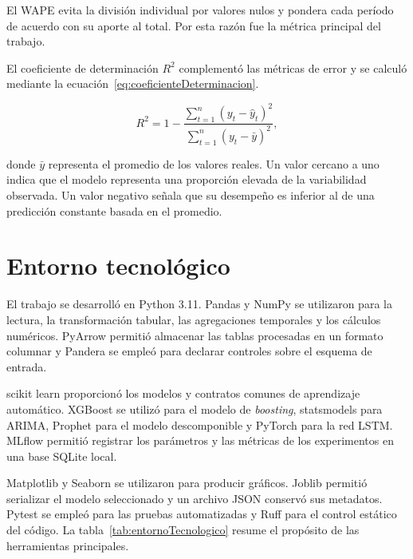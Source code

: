 El WAPE evita la división individual por valores nulos y pondera cada período de acuerdo con su aporte al total. Por esta razón fue la métrica principal del trabajo.

El coeficiente de determinación $R^2$ complementó las métricas de error y se calculó mediante la ecuación~\ref{eq:coeficienteDeterminacion}.

\begin{equation}
    \label{eq:coeficienteDeterminacion}
    R^2 = 1 - \frac{\sum_{t=1}^{n}\left(y_t-\hat{y}_t\right)^2}
    {\sum_{t=1}^{n}\left(y_t-\bar{y}\right)^2},
\end{equation}

donde $\bar{y}$ representa el promedio de los valores reales. Un valor cercano a uno indica que el modelo representa una proporción elevada de la variabilidad observada. Un valor negativo señala que su desempeño es inferior al de una predicción constante basada en el promedio.

\section{Entorno tecnológico}
\label{sec:entornoTecnologico}

El trabajo se desarrolló en Python 3.11. Pandas y NumPy se utilizaron para la lectura, la transformación tabular, las agregaciones temporales y los cálculos numéricos. PyArrow permitió almacenar las tablas procesadas en un formato columnar y Pandera se empleó para declarar controles sobre el esquema de entrada.

scikit learn proporcionó los modelos y contratos comunes de aprendizaje automático. XGBoost se utilizó para el modelo de \textit{boosting}, statsmodels para ARIMA, Prophet para el modelo descomponible y PyTorch para la red LSTM. MLflow permitió registrar los parámetros y las métricas de los experimentos en una base SQLite local.

Matplotlib y Seaborn se utilizaron para producir gráficos. Joblib permitió serializar el modelo seleccionado y un archivo JSON conservó sus metadatos. Pytest se empleó para las pruebas automatizadas y Ruff para el control estático del código. La tabla~\ref{tab:entornoTecnologico} resume el propósito de las herramientas principales.

